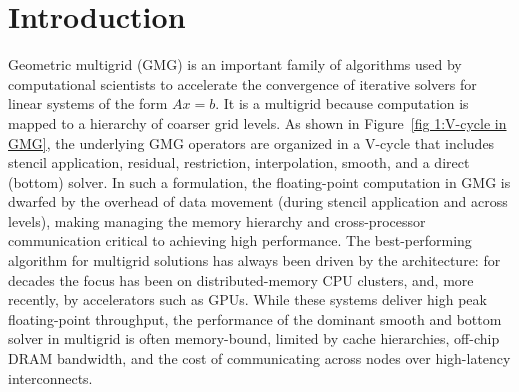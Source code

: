 \documentclass[sigconf]{acmart}
\begin{document}
\section{Introduction}
Geometric multigrid (GMG) is an important family of algorithms used by computational scientists to accelerate the convergence of iterative solvers for linear systems of the form $Ax=b$. It is a multigrid because computation is mapped to a hierarchy of coarser grid levels.  As shown in Figure~\ref{fig 1:V-cycle in GMG}, the underlying GMG operators are organized in a V-cycle that includes stencil application, residual, restriction, interpolation, smooth, and a direct (bottom) solver. %
In such a formulation, the floating-point computation in GMG is dwarfed by the overhead of data movement (during stencil application and across levels), making managing the memory hierarchy and cross-processor communication critical to achieving high performance.    
The best-performing algorithm for multigrid solutions has always been driven by the architecture: for decades the focus has been on 
distributed-memory CPU clusters, and, more recently, by accelerators such as GPUs. While these systems deliver high peak floating-point throughput, the performance of the dominant smooth and bottom solver in multigrid is often
memory-bound, limited by cache hierarchies, off-chip DRAM bandwidth, and the cost of communicating across nodes over high-latency interconnects. %
\end{document}
